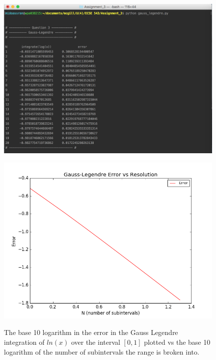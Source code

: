 \documentclass[11pt]{article}
\begin{document}
\begin{figure}[!hbp]
	\begin{center}
		\begin{minipage}{ 0.7\textwidth}
			\includegraphics[width= \textwidth]{o_GL_log}\\
		\end{minipage}
		\begin{minipage}{ \textwidth}
			\includegraphics[width=\textwidth]{GL_log}\\
		\end{minipage}
		\caption{\label{fig:GL_log}The base 10 logarithm in the error in the Gauss Legendre integration of $ln(x)$ over the interval $[0,1]$ plotted vs the base 10 logarithm of the number of subintervals the range is broken into.}
	\end{center}
\end{figure}
\end{document}
